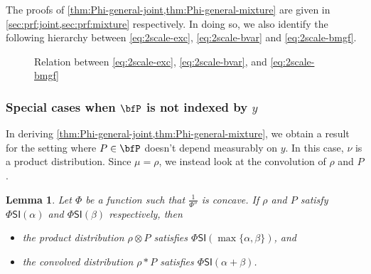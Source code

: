 \documentclass[11pt]{article}
\newtheorem{lemma}{Lemma}[section]
\newcounter{ct}
\newcommand{\PhiSI}[1]{\Phi\mathsf{SI}\left(#1\right)}
\begin{document}
The proofs of \cref{thm:Phi-general-joint,thm:Phi-general-mixture} are given in \cref{sec:prf:joint,sec:prf:mixture} respectively.
In doing so, we also identify the following hierarchy between \ref{eq:2scale-exc}, \ref{eq:2scale-bvar} and \ref{eq:2scale-bmgf}.

\begin{figure}[H]
\caption{Relation between \ref{eq:2scale-exc}, \ref{eq:2scale-bvar}, and \ref{eq:2scale-bmgf}}
\label{fig:hierarchy}
\end{figure}

\subsubsection{Special cases when \(\bfP\) is not indexed by \(y\)}

In deriving \cref{thm:Phi-general-joint,thm:Phi-general-mixture}, we obtain a result for the setting where \(P \in \bfP\) doesn't depend measurably on \(y\).
In this case, \(\nu\) is a product distribution.
Since \(\mu = \rho\), we instead look at the convolution of \(\rho\) and \(P\).

\begin{lemma}
\label{lem:conv-product-measure}
Let \(\Phi\) be a function such that \(\frac{1}{\Phi''}\) is concave.
If \(\rho\) and \(P\) satisfy \(\PhiSI{\alpha}\) and \(\PhiSI{\beta}\) respectively, then
\begin{itemize}[leftmargin=*,itemsep=0pt]
    \item the product distribution \(\rho \otimes P\) satisfies \(\PhiSI{\max\{\alpha, \beta\}}\), and
    \item the convolved distribution \(\rho \ast P\) satisfies \(\PhiSI{\alpha + \beta}\).
\end{itemize}
\end{lemma}
\end{document}
